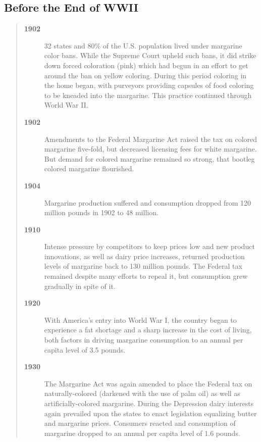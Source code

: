 \documentclass[serv,blindrev]{informs-serv}
\begin{document}
\subsection{Before the End of WWII}

\begin{quotation}

\begin{description}

\item[\bf 1902] 32 states and 80\% of the U.S. population lived under
margarine color bans. While the Supreme Court upheld such bans, it
did strike down forced coloration (pink) which had begun in an
effort to get around the ban on yellow coloring. During this period
coloring in the home began, with purveyors providing capsules of
food coloring to be kneaded into the margarine. This practice
continued through World War II.

\item[\bf 1902] Amendments to the Federal Margarine Act raised the tax
on colored margarine five-fold, but decreased licensing fees for
white margarine. But demand for colored margarine remained so
strong, that bootleg colored margarine flourished.

\item[\bf 1904] Margarine production suffered and consumption dropped
from 120 million pounds in 1902 to 48 million.

\item[\bf 1910] Intense pressure by competitors to keep prices low and
new product innovations, as well as dairy price increases, returned
production levels of margarine back to 130 million pounds. The
Federal tax remained despite many efforts to repeal it, but
consumption grew gradually in spite of it.

\item[\bf 1920] With America's entry into World War I, the country began
to experience a fat shortage and a sharp increase in the cost of
living,  both factors in driving margarine consumption to an annual
per capita level of 3.5 pounds.

\item[\bf 1930] The Margarine Act was again amended to place the Federal
tax on naturally-colored (darkened with the use of palm oil) as well
as artificially-colored margarine. During the Depression dairy
interests again prevailed upon the states to enact legislation
equalizing butter and margarine prices. Consumers reacted and
consumption of margarine dropped to an annual per capita level of
1.6 pounds.


\end{description}
\end{quotation}
\end{document}
